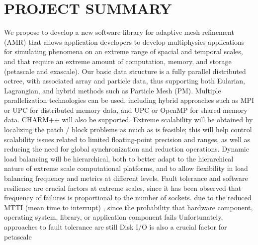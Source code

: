\documentclass[14pt]{article}
\begin{document}
\Large

\nocite{StSh09} %
\nocite{WiHy03} %
\nocite{GuWi06} %
\nocite{BuGh08} %



\section{PROJECT SUMMARY}  \label{s:summary}

%
We propose to develop a new software library for adaptive mesh
refinement (AMR) that allows application developers to develop
multiphysics applications for simulating phenomena on an extreme range
of spacial and temporal scales, and that require an extreme amount of
computation, memory, and storage (petascale and exascale).
%
Our basic data structure is a fully parallel distributed octree, with
associated array and particle data, thus supporting both Eularian, Lagrangian,
and hybrid methods such as Particle Mesh (PM).
%
Multiple parallelization technologies can be used, including hybrid
approaches such as MPI or UPC for distributed memory data, and UPC or
OpenMP for shared memory data.  CHARM++ will also be supported.
Extreme scalability will be obtained by localizing the patch / block
problems as much as is feasible; this will help control scalability
issues related to limited floating-point precision and ranges, as well
as reducing the need for global synchronization and reduction
operations.
%
Dynamic load balancing will be hierarchical, both to better adapt to
the hierarchical nature of extreme scale computational platforms, and
to allow flexibility in load balancing frequency and metrics at different
levels.
%
Fault tolerance and software resilience are crucial factors at extreme scales,
since it has been observed that frequency of failures is proportional to
the number of sockets.
due to the reduced MTTI (mean time to interrupt) , since the probability that hardware component, operating system, library, or application component fails Unfortunately, approaches to fault tolerance are still 
%
Disk I/O is also a crucial factor for petascale 
\end{document}
